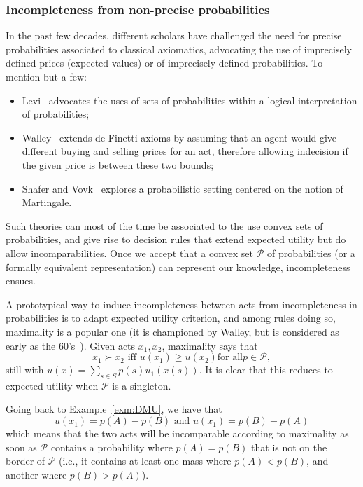\documentclass[french, english]{llncs}
\begin{document}
	\subsubsection{Incompleteness from non-precise probabilities}
	
	In the past few decades, different scholars have challenged the need for precise probabilities associated to classical axiomatics, advocating the use of imprecisely defined prices (expected values) or of imprecisely defined probabilities. To mention but a few:
	\begin{itemize} 
		\item Levi~\cite{levi_enterprise_1983} advocates the uses of sets of probabilities within a logical interpretation of probabilities;
		\item Walley~\cite{walley_statistical_1991} extends de Finetti axioms by assuming that an agent would give different buying and selling prices for an act, therefore allowing indecision if the given price is between these two bounds;
		\item Shafer and Vovk~\cite{shafer_probability_2005} explores a probabilistic setting centered on the notion of Martingale.
	\end{itemize}
	Such theories can most of the time be associated to the use convex sets of probabilities, and give rise to decision rules that extend expected utility but do allow incomparabilities. Once we accept that a convex set $\mathcal{P}$ of probabilities (or a formally equivalent representation) can represent our knowledge, incompleteness ensues. 
	
	A prototypical way to induce incompleteness between acts from incompleteness in probabilities is to adapt expected utility criterion, and among rules doing so, maximality is a popular one (it is championed by Walley, but is considered as early as the 60's~\cite{aumann_utility_1962}). Given acts $x_1,x_2$, maximality says that 
	$$x_1 \succ x_2 \textrm{ iff }  u(x_1) ≥ u(x_2) \textrm{for all} p \in \mathcal{P},$$
	still with $u(x) = \sum_{s \in S} p(s) u_1(x(s))$. It is clear that this reduces to expected utility when $\mathcal{P}$	is a singleton. 
	
	\begin{example}
		Going back to Example~\ref{exm:DMU}, we have that 
		$$u(x_1)=p(A) - p(B) \textrm{ and } u(x_1)=p(B) - p(A)$$
		which means that the two acts will be incomparable according to maximality as soon as $\mathcal{P}$ contains a probability where $p(A)=p(B)$ that is not on the border of $\mathcal{P}$ (i.e., it contains at least one mass where $p(A)<p(B)$, and another where $p(B)>p(A)$). 
	\end{example}
	
\end{document}
